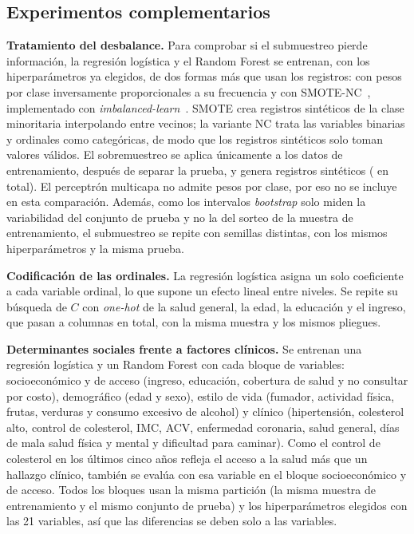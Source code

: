 \documentclass[journal]{IEEEtran}
\begin{document}
\subsection{Experimentos complementarios}\label{sec:complementarios}
\textbf{Tratamiento del desbalance.} Para comprobar si el submuestreo pierde información, la regresión logística y el Random Forest se entrenan, con los hiperparámetros ya elegidos, de dos formas más que usan los \nPool{} registros: con pesos por clase inversamente proporcionales a su frecuencia y con SMOTE-NC~\cite{chawla2002}, implementado con \emph{imbalanced-learn}~\cite{lemaitre2017}. SMOTE crea registros sintéticos de la clase minoritaria interpolando entre vecinos; la variante NC trata las variables binarias y ordinales como categóricas, de modo que los registros sintéticos solo toman valores válidos. El sobremuestreo se aplica únicamente a los datos de entrenamiento, después de separar la prueba, y genera \nSinteticos{} registros sintéticos (\nSmote{} en total). El perceptrón multicapa no admite pesos por clase, por eso no se incluye en esta comparación. Además, como los intervalos \emph{bootstrap} solo miden la variabilidad del conjunto de prueba y no la del sorteo de la muestra de entrenamiento, el submuestreo se repite con \nSemillas{} semillas distintas, con los mismos hiperparámetros y la misma prueba.

\textbf{Codificación de las ordinales.} La regresión logística asigna un solo coeficiente a cada variable ordinal, lo que supone un efecto lineal entre niveles. Se repite su búsqueda de $C$ con \emph{one-hot} de la salud general, la edad, la educación y el ingreso, que pasan a \ohColumnas{} columnas en total, con la misma muestra y los mismos pliegues.

\textbf{Determinantes sociales frente a factores clínicos.} Se entrenan una regresión logística y un Random Forest con cada bloque de variables: socioeconómico y de acceso (ingreso, educación, cobertura de salud y no consultar por costo), demográfico (edad y sexo), estilo de vida (fumador, actividad física, frutas, verduras y consumo excesivo de alcohol) y clínico (hipertensión, colesterol alto, control de colesterol, IMC, ACV, enfermedad coronaria, salud general, días de mala salud física y mental y dificultad para caminar). Como el control de colesterol en los últimos cinco años refleja el acceso a la salud más que un hallazgo clínico, también se evalúa con esa variable en el bloque socioeconómico y de acceso. Todos los bloques usan la misma partición (la misma muestra de entrenamiento y el mismo conjunto de prueba) y los hiperparámetros elegidos con las 21 variables, así que las diferencias se deben solo a las variables.
\end{document}
